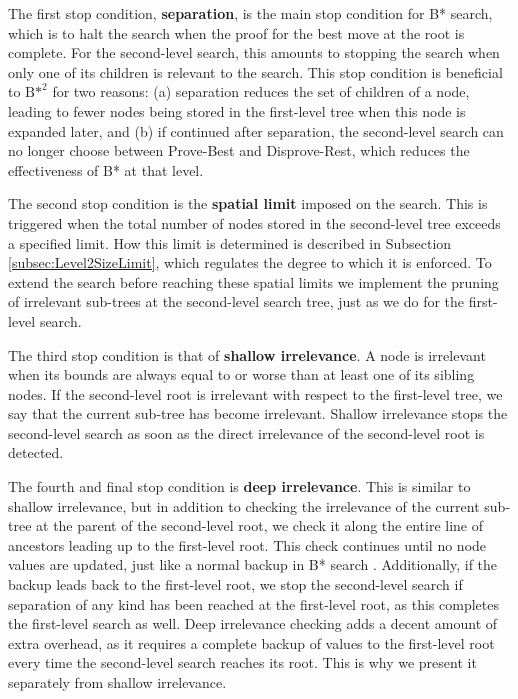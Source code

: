 The first stop condition, \textbf{separation}, is the main stop condition for B* search, which is to halt the search when the proof for the best move at the root is complete.
For the second-level search, this amounts to stopping the search when only one of its children is relevant to the search. This stop condition is beneficial to ${\text{B*}}^2$ for two reasons: (a) separation reduces the set of children of a node, leading to fewer nodes being stored in the first-level tree when this node is expanded later, and (b) if continued after separation, the second-level search can no longer choose between Prove-Best and Disprove-Rest, which reduces the effectiveness of B* at that level.

The second stop condition is the \textbf{spatial limit} imposed on the search. This is triggered when the total number of nodes stored in the second-level tree exceeds a specified limit. How this limit is determined is described in Subsection \ref{subsec:Level2SizeLimit}, which regulates the degree to which it is enforced. To extend the search before reaching these spatial limits we implement the pruning of irrelevant sub-trees at the second-level search tree, just as we do for the first-level search.

The third stop condition is that of \textbf{shallow irrelevance}. A node is irrelevant when its bounds are always equal to or worse than at least one of its sibling nodes. If the second-level root is irrelevant with respect to the first-level tree, we say that the current sub-tree has become irrelevant. Shallow irrelevance stops the second-level search as soon as the direct irrelevance of the second-level root is detected. 

The fourth and final stop condition is \textbf{deep irrelevance}. This is similar to shallow irrelevance, but in addition to checking the irrelevance of the current sub-tree at the parent of the second-level root, we check it along the entire line of ancestors leading up to the first-level root. This check continues until no node values are updated, just like a normal backup in B* search \cite{Berliner1979}. Additionally, if the backup leads back to the first-level root, we stop the second-level search if separation of any kind has been reached at the first-level root, as this completes the first-level search as well. Deep irrelevance checking adds a decent amount of extra overhead, as it requires a complete backup of values to the first-level root every time the second-level search reaches its root. This is why we present it separately from shallow irrelevance.
% 

